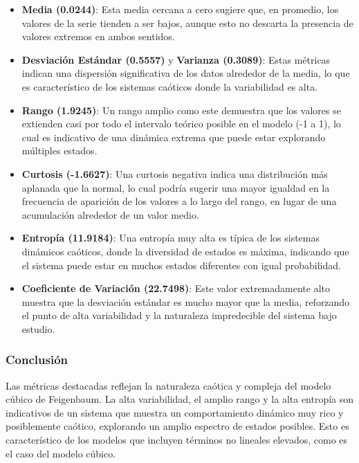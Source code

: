 \documentclass[11pt]{article}
\begin{document}
\begin{itemize}
\item
  \textbf{Media (0.0244)}: Esta media cercana a cero sugiere que, en
  promedio, los valores de la serie tienden a ser bajos, aunque esto no
  descarta la presencia de valores extremos en ambos sentidos.
\item
  \textbf{Desviación Estándar (0.5557)} y \textbf{Varianza (0.3089)}:
  Estas métricas indican una dispersión significativa de los datos
  alrededor de la media, lo que es característico de los sistemas
  caóticos donde la variabilidad es alta.
\item
  \textbf{Rango (1.9245)}: Un rango amplio como este demuestra que los
  valores se extienden casi por todo el intervalo teórico posible en el
  modelo (-1 a 1), lo cual es indicativo de una dinámica extrema que
  puede estar explorando múltiples estados.
\item
  \textbf{Curtosis (-1.6627)}: Una curtosis negativa indica una
  distribución más aplanada que la normal, lo cual podría sugerir una
  mayor igualdad en la frecuencia de aparición de los valores a lo largo
  del rango, en lugar de una acumulación alrededor de un valor medio.
\item
  \textbf{Entropía (11.9184)}: Una entropía muy alta es típica de los
  sistemas dinámicos caóticos, donde la diversidad de estados es máxima,
  indicando que el sistema puede estar en muchos estados diferentes con
  igual probabilidad.
\item
  \textbf{Coeficiente de Variación (22.7498)}: Este valor extremadamente
  alto muestra que la desviación estándar es mucho mayor que la media,
  reforzando el punto de alta variabilidad y la naturaleza impredecible
  del sistema bajo estudio.
\end{itemize}

\hypertarget{conclusiuxf3n}{%
\subsubsection{Conclusión}\label{conclusiuxf3n}}

Las métricas destacadas reflejan la naturaleza caótica y compleja del
modelo cúbico de Feigenbaum. La alta variabilidad, el amplio rango y la
alta entropía son indicativos de un sistema que muestra un
comportamiento dinámico muy rico y posiblemente caótico, explorando un
amplio espectro de estados posibles. Esto es característico de los
modelos que incluyen términos no lineales elevados, como es el caso del
modelo cúbico.
\end{document}
